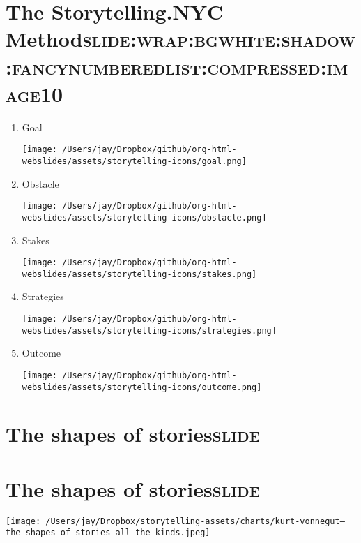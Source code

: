\documentclass[12pt]{article}
\begin{document}
\section[The Storytelling.NYC Method]{The Storytelling.NYC Method\hfill{}\textsc{slide:wrap:bgwhite:shadow:fancynumberedlist:compressed:image10}}
\label{sec:org48b5b93}
\begin{enumerate}
\item Goal \begin{center}
\texttt{[image: /Users/jay/Dropbox/github/org-html-webslides/assets/storytelling-icons/goal.png]}
\end{center}
\item Obstacle \begin{center}
\texttt{[image: /Users/jay/Dropbox/github/org-html-webslides/assets/storytelling-icons/obstacle.png]}
\end{center}
\item Stakes \begin{center}
\texttt{[image: /Users/jay/Dropbox/github/org-html-webslides/assets/storytelling-icons/stakes.png]}
\end{center}
\item Strategies \begin{center}
\texttt{[image: /Users/jay/Dropbox/github/org-html-webslides/assets/storytelling-icons/strategies.png]}
\end{center}
\item Outcome \begin{center}
\texttt{[image: /Users/jay/Dropbox/github/org-html-webslides/assets/storytelling-icons/outcome.png]}
\end{center}
\end{enumerate}

\section[The \textbf{shapes} of \textbf{stories}]{The \textbf{shapes} of \textbf{stories}\hfill{}\textsc{slide}}
\label{sec:org1c0f9ee}

\section[The \textbf{shapes} of \textbf{stories}]{The \textbf{shapes} of \textbf{stories}\hfill{}\textsc{slide}}
\label{sec:org6272b72}
\begin{center}
\texttt{[image: /Users/jay/Dropbox/storytelling-assets/charts/kurt-vonnegut--the-shapes-of-stories-all-the-kinds.jpeg]}
\end{center}
\end{document}
